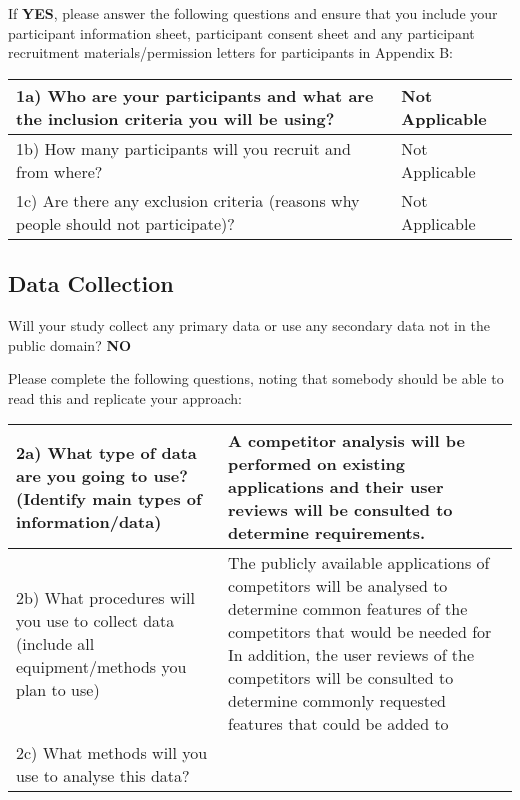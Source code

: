 \documentclass[../CHEFCookingHelperForEveryonesFridge.tex]{subfiles}
\begin{document}
If \textbf{YES}, please answer the following questions and ensure that you include your participant
information sheet, participant consent sheet and any participant recruitment materials/permission
letters for participants in Appendix B:

\begin{table}[h!]
    \begin{tabulary}{\textwidth}{|L|L|}
        \hline
        1a) Who are your participants and what are the inclusion criteria you will be using? & Not Applicable \\\hline
        1b) How many participants will you recruit and from where? & Not Applicable \\\hline
        1c) Are there any exclusion criteria (reasons why people should not participate)? & Not Applicable \\\hline
    \end{tabulary}
\end{table}

\subsection{Data Collection}
Will your study collect any primary data or use any secondary data not in the public domain? \textbf{NO}

Please complete the following questions, noting that somebody should be able to read this and replicate your approach:

{}
\begin{table}[h!]
    \begin{tabulary}{\textwidth}{|L|L|}
        \hline
        2a) What type of data are you going to use? (Identify main types of information/data)
            &
        A competitor analysis will be performed on existing applications and their user reviews will be consulted to determine requirements.
            \\\hline
        2b) What procedures will you use to collect data (include all equipment/methods you plan to use)
            &
        The publicly available applications of competitors will be analysed to determine common features of the competitors that would be needed for \chef{}
        In addition, the user reviews of the competitors will be consulted to determine commonly requested features that could be added to \chef{}
            \\\hline
        2c) What methods will you use to analyse this data?
            &

            \\\hline
    \end{tabulary}
\end{table}
\end{document}
